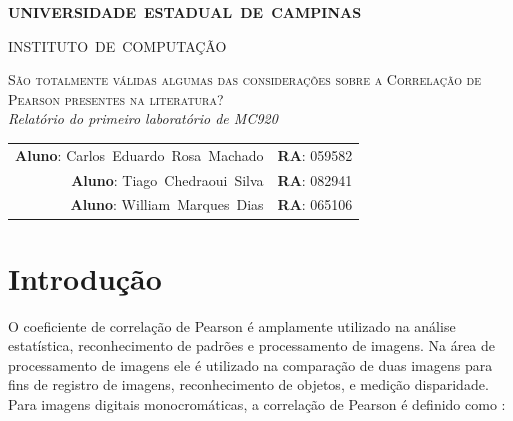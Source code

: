 \documentclass[10pt,a4paper]{article}
\begin{document}
\begin{titlepage}
  \thispagestyle{empty}
  \begin{center} {\large \textbf{UNIVERSIDADE~ESTADUAL~DE~CAMPINAS}} \end{center}
  \begin{center} {\large INSTITUTO~DE~COMPUTAÇÃO}                    \end{center}
  \vspace{0.1cm}
  \begin{center}
    \begin{minipage}[tl]{31mm}
    \end{minipage}
  \end{center}
  \vspace{0.3cm}
  \begin{center} 
    {\large \textsc{São totalmente válidas algumas das considerações sobre a
        Correlação de Pearson presentes na literatura?  }} 
    \\\vspace{0.5cm}
    {\textsl{Relatório do primeiro laboratório de MC920}}
    \\\vspace{1cm}
    \begin{tabular}{rl}
      \textbf{Aluno}:   Carlos~Eduardo~Rosa~Machado &
      \textbf{RA}:          059582 \\ 
      \textbf{Aluno}:        Tiago~Chedraoui~Silva & 
      \textbf{RA}:        082941 \\
      \textbf{Aluno}:        William~Marques~Dias & 
      \textbf{RA}:        065106 \\
    \end{tabular}
  \end{center}
  \vspace{0.5cm}

  \begin{abstract}
    O coeficiente de correlação de Pearson é amplamente usado para
    comparar imagens, contudo ele apresenta sérias limitações. Esse
    trabalho consistiu na validação da análise realizada no Artigo ''The
    Ineffectiveness of the Correlation Coefficient for Image Comparisons''.
  \end{abstract}
  \tableofcontents
\end{titlepage} 

\vspace{2mm}
\newpage

\section{Introdução}
O coeficiente de correlação de Pearson é amplamente
utilizado na análise estatística, reconhecimento de padrões e
processamento de imagens.
Na área de processamento de imagens ele é utilizado na comparação de
duas imagens para fins de registro de imagens, reconhecimento de
objetos, e medição disparidade. Para imagens digitais monocromáticas, a correlação de Pearson é definido como :
\end{document}
